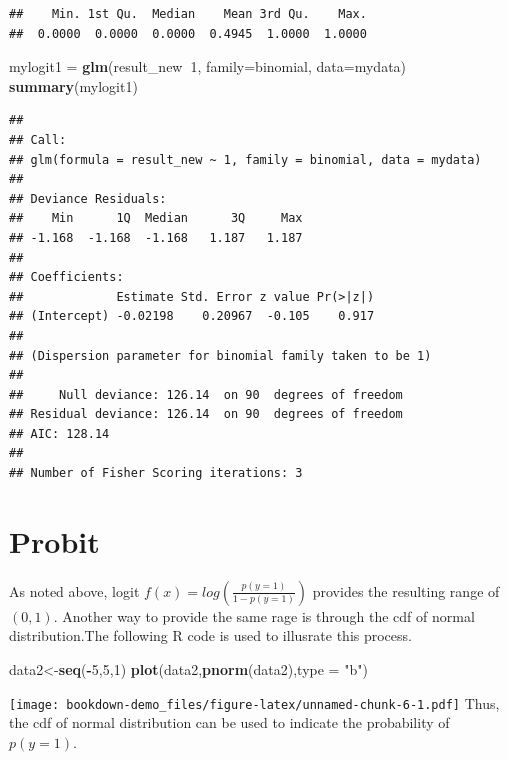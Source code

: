 \documentclass[]{book}
\newenvironment{Shaded}{\begin{snugshade}}{\end{snugshade}}
\newcommand{\DataTypeTok}[1]{\textcolor[rgb]{0.13,0.29,0.53}{#1}}
\newcommand{\DecValTok}[1]{\textcolor[rgb]{0.00,0.00,0.81}{#1}}
\newcommand{\KeywordTok}[1]{\textcolor[rgb]{0.13,0.29,0.53}{\textbf{#1}}}
\newcommand{\NormalTok}[1]{#1}
\newcommand{\OperatorTok}[1]{\textcolor[rgb]{0.81,0.36,0.00}{\textbf{#1}}}
\newcommand{\StringTok}[1]{\textcolor[rgb]{0.31,0.60,0.02}{#1}}
\begin{document}
\begin{verbatim}
##    Min. 1st Qu.  Median    Mean 3rd Qu.    Max. 
##  0.0000  0.0000  0.0000  0.4945  1.0000  1.0000
\end{verbatim}

\begin{Shaded}
\begin{Highlighting}[]
\NormalTok{mylogit1 =}\StringTok{ }\KeywordTok{glm}\NormalTok{(result_new}\OperatorTok{~}\DecValTok{1}\NormalTok{, }\DataTypeTok{family=}\NormalTok{binomial, }\DataTypeTok{data=}\NormalTok{mydata)}
\KeywordTok{summary}\NormalTok{(mylogit1)}
\end{Highlighting}
\end{Shaded}

\begin{verbatim}
## 
## Call:
## glm(formula = result_new ~ 1, family = binomial, data = mydata)
## 
## Deviance Residuals: 
##    Min      1Q  Median      3Q     Max  
## -1.168  -1.168  -1.168   1.187   1.187  
## 
## Coefficients:
##             Estimate Std. Error z value Pr(>|z|)
## (Intercept) -0.02198    0.20967  -0.105    0.917
## 
## (Dispersion parameter for binomial family taken to be 1)
## 
##     Null deviance: 126.14  on 90  degrees of freedom
## Residual deviance: 126.14  on 90  degrees of freedom
## AIC: 128.14
## 
## Number of Fisher Scoring iterations: 3
\end{verbatim}

\hypertarget{probit}{%
\section{Probit}\label{probit}}

As noted above, logit \(f(x)=log(\frac{p(y=1)}{1-p(y=1)})\) provides the resulting range of \((0,1)\). Another way to provide the same rage is through the cdf of normal distribution.The following R code is used to illusrate this process.

\begin{Shaded}
\begin{Highlighting}[]
\NormalTok{data2<-}\KeywordTok{seq}\NormalTok{(}\OperatorTok{-}\DecValTok{5}\NormalTok{,}\DecValTok{5}\NormalTok{,}\DecValTok{1}\NormalTok{)}
\KeywordTok{plot}\NormalTok{(data2,}\KeywordTok{pnorm}\NormalTok{(data2),}\DataTypeTok{type =} \StringTok{"b"}\NormalTok{)}
\end{Highlighting}
\end{Shaded}

\texttt{[image: bookdown-demo\_files/figure-latex/unnamed-chunk-6-1.pdf]}
Thus, the cdf of normal distribution can be used to indicate the probability of \(p(y=1)\).
\end{document}

